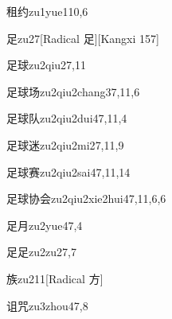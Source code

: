 \begin{entry}{租约}{zu1yue1}{10,6}
\end{entry}

\begin{entry}{足}{zu2}{7}[Radical 足][Kangxi 157]
\end{entry}

\begin{entry}{足球}{zu2qiu2}{7,11}
\end{entry}

\begin{entry}{足球场}{zu2qiu2chang3}{7,11,6}
\end{entry}

\begin{entry}{足球队}{zu2qiu2dui4}{7,11,4}
\end{entry}

\begin{entry}{足球迷}{zu2qiu2mi2}{7,11,9}
\end{entry}

\begin{entry}{足球赛}{zu2qiu2sai4}{7,11,14}
\end{entry}

\begin{entry}{足球协会}{zu2qiu2xie2hui4}{7,11,6,6}
\end{entry}

\begin{entry}{足月}{zu2yue4}{7,4}
\end{entry}

\begin{entry}{足足}{zu2zu2}{7,7}
\end{entry}

\begin{entry}{族}{zu2}{11}[Radical 方]
\end{entry}

\begin{entry}{诅咒}{zu3zhou4}{7,8}
\end{entry}

